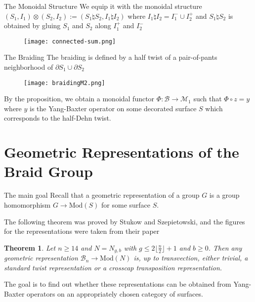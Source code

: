 \documentclass{beamer}
\newtheorem{thm}{Theorem}[section]
\theoremstyle{definition}
\theoremstyle{remark}
\newcommand{\Mod}{{\mathrm{Mod}}}
\begin{document}
\begin{frame}{The Monoidal Structure}
     We equip it with the
     monoidal structure 
     $(S_1, I_1) \otimes
     (S_2, I_2) :=
     (S_1 \natural S_2, I_1 \natural
     I_2)$ where
     $I_1 \natural I_2 = I_1^{-}
     \cup I_2^{+}$ and
     $S_1 \natural S_2$ is obtained
     by gluing $S_1$ and
     $S_2$ along $I_1^+$ and
     $I_2^-$
     \begin{figure}
         \centering
         \texttt{[image: connected-sum.png]}
         \label{fig:enter-label}
     \end{figure}

\end{frame}

\begin{frame}{The Braiding}
The braiding is defined by a half twist
of a pair-of-pants neighborhood of
$\partial S_1 \cup \partial S_2$
    \begin{figure}
        \centering
        \texttt{[image: braidingM2.png]}
        \label{fig:enter-label}
    \end{figure}

    By the proposition, we
    obtain a monoidal functor
    $\Phi \colon \mathcal{B} \to
    \mathcal{M}_1$ such that
    $\Phi \circ z = y$ where
    $y$ is the Yang-Baxter operator on
    some decorated surface
    $S$ which corresponds to
    the half-Dehn twist.
\end{frame}

\section{Geometric Representations
of the Braid Group}

\begin{frame}{The main goal}
    Recall that 
a geometric representation of a group
$G$ is a group homomorphism
$G \to \Mod(S)$ for some surface $S$.

The following theorem was proved by Stukow and Szepietowski, and the figures for the representations were taken from their paper

\begin{thm}
    Let $n \geq 14$ and
    $N = N_{g,b}$ with $g \leq 
    2 \lfloor \frac{n}{2} \rfloor + 1
    $ and $b \geq 0$. Then any 
    geometric representation 
    $\mathcal{B}_n \to \Mod(N)$
    is, up to transvection, either trivial, a standard twist representation or a crosscap transposition representation.
\end{thm}

The goal is to find out
whether these representations
can be obtained from Yang-Baxter operators
on an appropriately chosen
category of surfaces.
\end{frame}
\end{document}
